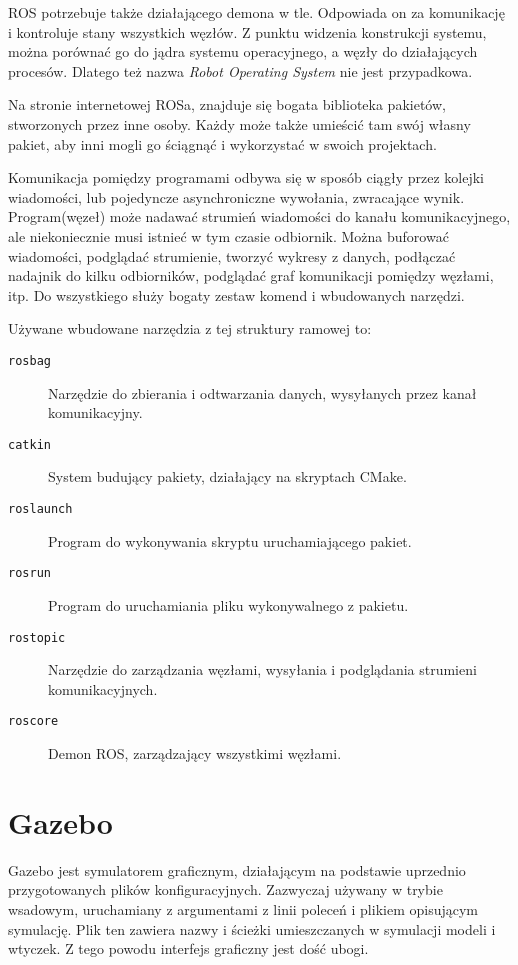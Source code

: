 	ROS potrzebuje także działającego demona w tle. Odpowiada on za komunikację i kontroluje stany wszystkich węzłów.
	Z punktu widzenia konstrukcji systemu, można porównać go do jądra systemu operacyjnego, a węzły do działających procesów.
	Dlatego też nazwa \emph{Robot Operating System} nie jest przypadkowa.
		
	Na stronie internetowej ROSa, znajduje się bogata biblioteka pakietów, stworzonych przez inne osoby.
	Każdy może także umieścić tam swój własny pakiet, aby inni mogli go ściągnąć i wykorzystać w swoich projektach.

	Komunikacja pomiędzy programami odbywa się w sposób ciągły przez kolejki wiadomości, lub pojedyncze asynchroniczne wywołania, zwracające wynik.
	Program(węzeł) może nadawać strumień wiadomości do kanału komunikacyjnego, ale niekoniecznie musi istnieć w tym czasie odbiornik.
	Można buforować wiadomości, podglądać strumienie, tworzyć wykresy z danych, podłączać nadajnik do kilku odbiorników, podglądać graf komunikacji pomiędzy węzłami, itp.
	Do wszystkiego służy bogaty zestaw komend i wbudowanych narzędzi.
	
	Używane wbudowane narzędzia z tej struktury ramowej to:
	\begin{description}
		\item[\texttt{rosbag}] Narzędzie do zbierania i odtwarzania danych, wysyłanych przez kanał komunikacyjny.
		\item[\texttt{catkin}] System budujący pakiety, działający na skryptach CMake.
		\item[\texttt{roslaunch}] Program do wykonywania skryptu uruchamiającego pakiet.
		\item[\texttt{rosrun}] Program do uruchamiania pliku wykonywalnego z pakietu.
		\item[\texttt{rostopic}] Narzędzie do zarządzania węzłami, wysyłania i podglądania strumieni komunikacyjnych.
		\item[\texttt{roscore}] Demon ROS, zarządzający wszystkimi węzłami.
	\end{description}

\section{Gazebo}
	Gazebo \cite{gazebo_website} jest symulatorem graficznym, działającym na podstawie uprzednio przygotowanych plików konfiguracyjnych.
	Zazwyczaj używany w trybie wsadowym, uruchamiany z argumentami z linii poleceń i plikiem opisującym symulację.
	Plik ten zawiera nazwy i ścieżki umieszczanych w symulacji modeli i wtyczek.
	Z tego powodu interfejs graficzny jest dość ubogi.

